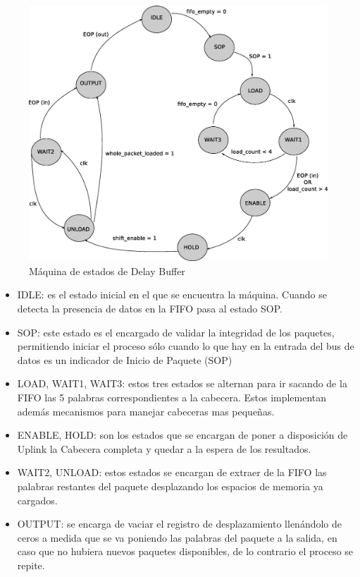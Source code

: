 \begin{figure}[H]
  \centering
	\includegraphics[scale=0.50]{3-arquitectura/graf/estdelaycompleto.eps}
  \caption{Máquina de estados de Delay Buffer}
  \label{fig:dbstate}
\end{figure}

\begin{itemize}
	\item IDLE: es el estado inicial en el que se encuentra la máquina. Cuando se detecta la presencia de datos en la FIFO pasa al estado SOP.
	\item SOP: este estado es el encargado de validar la integridad de los paquetes, permitiendo iniciar el proceso sólo cuando lo que hay en la entrada del bus de datos es un indicador de Inicio de Paquete (SOP)
	\item LOAD, WAIT1, WAIT3: estos tres estados se alternan para ir sacando de la FIFO las 5 palabras correspondientes a la cabecera. Estos implementan además mecanismos para manejar cabeceras mas pequeñas.
	\item ENABLE, HOLD: son los estados que se encargan de poner a disposición de Uplink la Cabecera completa y quedar a la espera de los resultados.
	\item WAIT2, UNLOAD: estos estados se encargan de extraer de la FIFO las palabras restantes del paquete desplazando los espacios de memoria ya cargados. 
	\item OUTPUT: se encarga de vaciar el registro de desplazamiento llenándolo de ceros a medida que se va poniendo las palabras del paquete a la salida, en caso que no hubiera nuevos paquetes disponibles, de lo contrario el proceso se repite.
\end{itemize}

